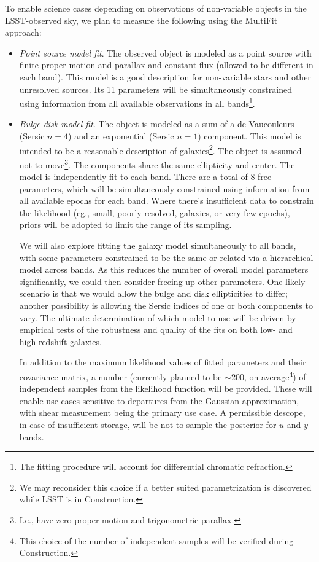 \documentclass[12pt]{article}
\newcommand{\req}[1]{\marginpar{\tiny #1}}
\newcommand{\dmreq}[1]{\req{DMS-REQ-#1}}
\begin{document}
To enable science cases depending on observations of non-variable objects in the LSST-observed sky, we plan to measure the following using the MultiFit approach:
%
\begin{itemize}
    \item \emph{Point source model fit}. The observed object is modeled as a point source with finite proper motion and parallax and constant flux (allowed to be different in each band). \dmreq{0276} This model is a good description for non-variable stars and other unresolved sources. Its 11 parameters will be simultaneously constrained using information from all available observations in all bands\footnote{The fitting procedure will account for differential chromatic refraction.}.
    \item \emph{Bulge-disk model fit}. \dmreq{0276} The object is modeled as a sum of a de Vaucouleurs (Sersic $n=4$) and an exponential (Sersic $n=1$) component. This model is intended to be a reasonable description of galaxies\footnote{We may reconsider this choice if a better suited parametrization is discovered while LSST is in Construction.}. The object is assumed not to move\footnote{I.e., have zero proper motion and trigonometric parallax.}. The components share the same ellipticity and center. The model is independently fit to each band. There are a total of 8 free parameters, which will be simultaneously constrained using information from all available epochs for each band. Where there's insufficient data to constrain the likelihood (eg., small, poorly resolved, galaxies, or very few epochs), priors will be adopted to limit the range of its sampling.

We will also explore fitting the galaxy model simultaneously to all bands, with some parameters constrained to be the same or related via a hierarchical model across bands.  As this reduces the number of overall model parameters significantly, we could then consider freeing up other parameters. One likely scenario is that we would allow the bulge and disk ellipticities to differ; another possibility is allowing the Sersic indices of one or both components to vary.  The ultimate determination of which model to use will be driven by empirical tests of the robustness and quality of the fits on both low- and high-redshift galaxies.

\dmreq{0333}
In addition to the maximum likelihood values of fitted parameters and their covariance matrix, a number (currently planned to be $\sim 200$, on average\footnote{This choice of the number of independent samples will be verified during Construction.}) of independent samples from the likelihood function will be provided. These will enable use-cases sensitive to departures from the Gaussian approximation, with shear measurement being the primary use case. A permissible descope, in case of insufficient storage, will be not to sample the posterior for $u$ and $y$ bands.


\end{itemize}
\end{document}
